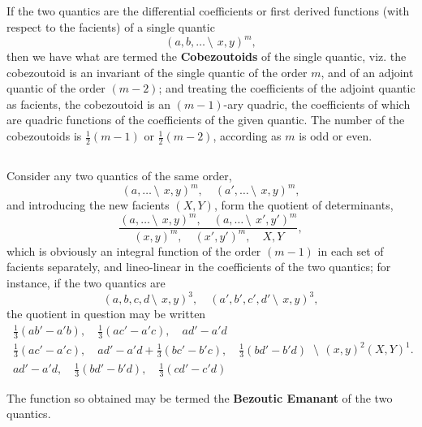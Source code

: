 \documentclass[11pt,a4paper]{book}
\begin{document}
\begin{center}
\subsection{}

If the two quantics are the differential coefficients or first derived functions (with respect to the facients) of a single quantic
\[
(a, b, \ldots \,\setminus\!\!\:\, x, y)^m,
\]
then we have what are termed the \textbf{Cobezoutoids} of the single quantic, viz. the cobezoutoid is an invariant of the single quantic of the order $m$, and of an adjoint quantic of the order $(m - 2)$; and treating the coefficients of the adjoint quantic as facients, the cobezoutoid is an $(m - 1)$-ary quadric, the coefficients of which are quadric functions of the coefficients of the given quantic. The number of the cobezoutoids is $\frac{1}{2}(m - 1)$ or $\frac{1}{2}(m - 2)$, according as $m$ is odd or even.

\subsection{}

Consider any two quantics of the same order,
\[
(a, \ldots \,\setminus\!\!\:\, x, y)^m, \quad (a', \ldots \,\setminus\!\!\:\, x, y)^m,
\]
and introducing the new facients $(X, Y)$, form the quotient of determinants,
\[
\frac{(a, \ldots \,\setminus\!\!\:\, x, y)^m, \quad (a, \ldots \,\setminus\!\!\:\, x', y')^m}{(x, y)^m, \quad (x', y')^m, \quad X, Y},
\]
which is obviously an integral function of the order $(m - 1)$ in each set of facients separately, and lineo-linear in the coefficients of the two quantics; for instance, if the two quantics are
\[
(a, b, c, d\,\setminus\!\!\:\, x, y)^3, \quad (a', b', c', d'\,\setminus\!\!\:\, x, y)^3,
\]
the quotient in question may be written
\[
\begin{array}{c}
\frac{1}{3}(ab' - a'b), \quad \frac{1}{3}(ac' - a'c), \quad ad' - a'd \\
\frac{1}{3}(ac' - a'c), \quad ad' - a'd + \frac{1}{3}(bc' - b'c), \quad \frac{1}{3}(bd' - b'd) \\
ad' - a'd, \quad \frac{1}{3}(bd' - b'd), \quad \frac{1}{3}(cd' - c'd)
\end{array}
\,\setminus\!\!\:\, (x, y)^2(X, Y)^1.
\]

The function so obtained may be termed the \textbf{Bezoutic Emanant} of the two quantics.

\subsection{}


\end{center}
\end{document}
